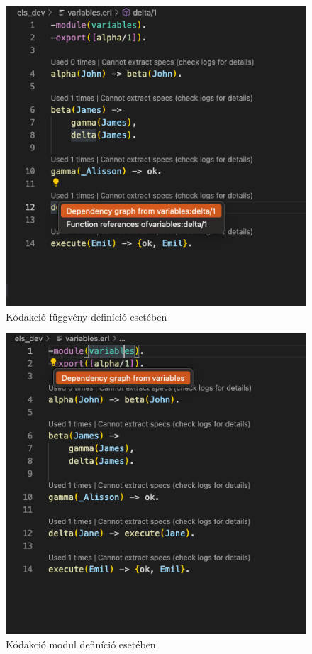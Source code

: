 \begin{figure}[H]
  \centering
  \includegraphics[width=0.7\linewidth]{images/testCases/CodeActFun.png}
  \caption{Kódakció függvény definíció esetében}
  \label{fig:CodeActFun}
\end{figure}

\begin{figure}[H]
  \centering
  \includegraphics[width=0.7\linewidth]{images/testCases/CodeActMod.png}
  \caption{Kódakció modul definíció esetében}
  \label{fig:CodeActMod}
\end{figure}


